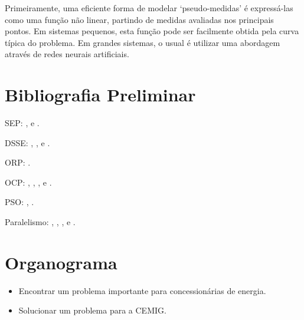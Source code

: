 \documentclass{IEEEtran}
\begin{document}
Primeiramente, uma eficiente forma de modelar `pseudo-medidas' é expressá-las como uma função não linear, partindo de medidas avaliadas nos principais pontos. Em sistemas pequenos, esta função pode  ser facilmente obtida pela curva típica do problema. Em grandes sistemas, o usual é utilizar uma abordagem através de redes neurais artificiais.

\section{Bibliografia Preliminar}
SEP: \cite{gonen2008electric}, \textbf{\cite{del2008particle}} e \cite{zimmerman1995comprehensive}.

DSSE: \cite{caro2009power}, \cite{abur2004power}, \cite{singh2009choice} e \cite{manitsas2012distribution}.

ORP: \cite{lenin2014integration}.

OCP: \cite{delfanti2000optimal}, \cite{abul2013optimal}, \textit{\cite{kim2011optimal}}, \textit{\cite{hamouda2013optimal}} e \cite{alcantra}.

PSO: \cite{rosendo2010algoritmo}, \cite{zhang2008active}.

Paralelismo: \cite{tagliari2006grids}, \cite{hporemuhle2013sistemas}, \cite{de2003arquiteturas}, \cite{chapman2008using} e \cite{fadlallah2000parallel}.


\section{Organograma}
\begin{itemize}
\item Encontrar um problema importante para concessionárias de energia.
\item Solucionar um problema para a CEMIG.
\end{itemize}

\vspace{10mm}

\end{document}
